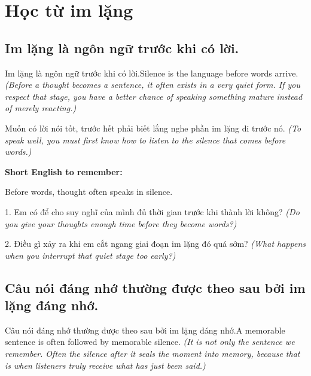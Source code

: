 \chapter{Học từ im lặng}


\section{Im lặng là ngôn ngữ trước khi có lời.}
\begin{truyen}{Im lặng là ngôn ngữ trước khi có lời.}{Silence is the language before words arrive.}
\textit{(Before a thought becomes a sentence, it often exists in a very quiet form. If you respect that stage, you have a better chance of speaking something mature instead of merely reacting.)}
\end{truyen}

\begin{baihoc}
Muốn có lời nói tốt, trước hết phải biết lắng nghe phần im lặng đi trước nó.
\textit{(To speak well, you must first know how to listen to the silence that comes before words.)}
\end{baihoc}

\begin{ghinhoanh}
\textbf{Short English to remember:}

Before words, thought often speaks in silence.

\end{ghinhoanh}

\begin{tuhocnhanh}
1. Em có để cho suy nghĩ của mình đủ thời gian trước khi thành lời không? \textit{(Do you give your thoughts enough time before they become words?)}

2. Điều gì xảy ra khi em cắt ngang giai đoạn im lặng đó quá sớm? \textit{(What happens when you interrupt that quiet stage too early?)}
\end{tuhocnhanh}
\ngancach


\section{Câu nói đáng nhớ thường được theo sau bởi im lặng đáng nhớ.}
\begin{truyen}{Câu nói đáng nhớ thường được theo sau bởi im lặng đáng nhớ.}{A memorable sentence is often followed by memorable silence.}
\textit{(It is not only the sentence we remember. Often the silence after it seals the moment into memory, because that is when listeners truly receive what has just been said.)}
\end{truyen}

